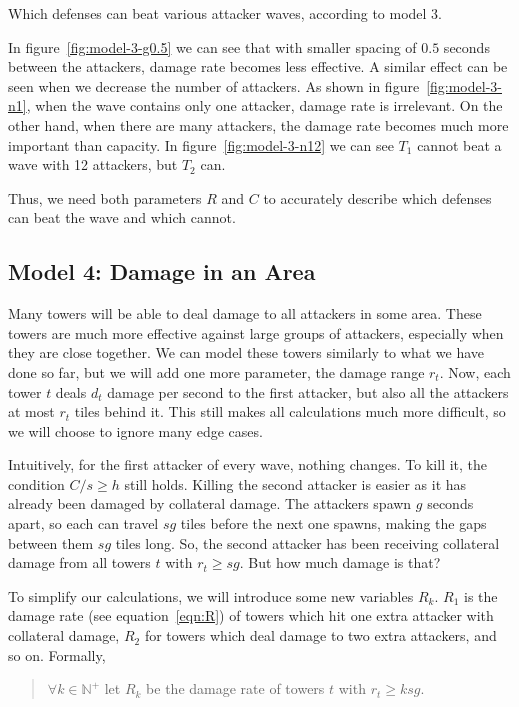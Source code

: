 \begin{center}
\begin{minipage}{.33\textwidth}
        \label{fig:model-3-n12}
    \end{minipage}%
    \caption{Which defenses can beat various attacker waves, according to model 3.}
    \label{fig:model3}
\end{center}

In figure~\ref{fig:model-3-g0.5} we can see that with smaller spacing of $0.5$ seconds between the attackers, damage rate becomes less effective.
A similar effect can be seen when we decrease the number of attackers.
As shown in figure~\ref{fig:model-3-n1}, when the wave contains only one attacker, damage rate is irrelevant.
On the other hand, when there are many attackers, the damage rate becomes much more important than capacity.
In figure~\ref{fig:model-3-n12} we can see $T_1$ cannot beat a wave with 12 attackers, but $T_2$ can.

Thus, we need both parameters $R$ and $C$ to accurately describe which defenses can beat the wave and which cannot.

\subsection{Model 4: Damage in an Area}\label{sec:analysis-waves-aoe}
Many towers will be able to deal damage to all attackers in some area.
These towers are much more effective against large groups of attackers, especially when they are close together.
We can model these towers similarly to what we have done so far, but we will add one more parameter, the damage range $r_t$.
Now, each tower $t$ deals $d_t$ damage per second to the first attacker, but also all the attackers at most $r_t$ tiles behind it.
This still makes all calculations much more difficult, so we will choose to ignore many edge cases.

Intuitively, for the first attacker of every wave, nothing changes.
To kill it, the condition $C/s \geq h$ still holds.
Killing the second attacker is easier as it has already been damaged by collateral damage.
The attackers spawn $g$ seconds apart, so each can travel $sg$ tiles before the next one spawns, making the gaps between them $sg$ tiles long.
So, the second attacker has been receiving collateral damage from all towers $t$ with $r_t \geq sg$.
But how much damage is that?

To simplify our calculations, we will introduce some new variables $R_k$.
$R_1$ is the damage rate (see equation~\ref{eqn:R}) of towers which hit one extra attacker with collateral damage, $R_2$ for towers which deal damage to two extra attackers, and so on.
Formally,
\begin{quotation}
    $\forall k \in \mathbb{N}^+$ let $R_k$ be the damage rate of towers $t$ with $r_t \geq ksg$.
\end{quotation}


